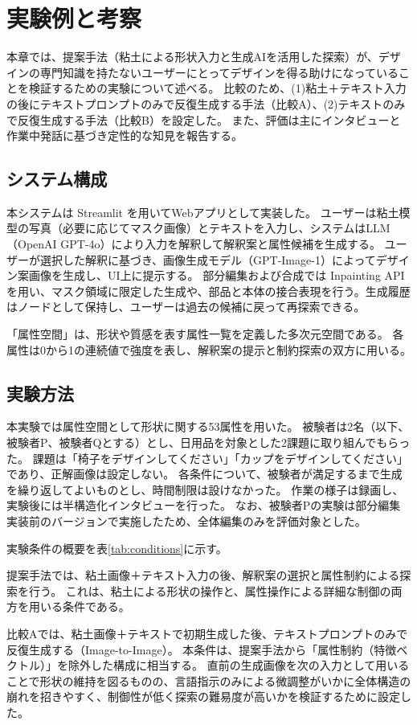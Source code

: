 \documentclass{kuisthesis}
\begin{document}
\section{実験例と考察}
本章では、提案手法（粘土による形状入力と生成AIを活用した探索）が、デザインの専門知識を持たないユーザーにとってデザインを得る助けになっていることを検証するための実験について述べる。
比較のため、(1)粘土＋テキスト入力の後にテキストプロンプトのみで反復生成する手法（比較A）、(2)テキストのみで反復生成する手法（比較B）を設定した。
また、評価は主にインタビューと作業中発話に基づき定性的な知見を報告する。

\subsection{システム構成}
本システムは Streamlit を用いてWebアプリとして実装した。
ユーザーは粘土模型の写真（必要に応じてマスク画像）とテキストを入力し、システムはLLM（OpenAI GPT-4o）により入力を解釈して解釈案と属性候補を生成する。
ユーザーが選択した解釈に基づき、画像生成モデル（GPT-Image-1）によってデザイン案画像を生成し、UI上に提示する。
部分編集および合成では Inpainting API を用い、マスク領域に限定した生成や、部品と本体の接合表現を行う。生成履歴はノードとして保持し、ユーザーは過去の候補に戻って再探索できる。

「属性空間」は、形状や質感を表す属性一覧を定義した多次元空間である。
各属性は0から1の連続値で強度を表し、解釈案の提示と制約探索の双方に用いる。

\subsection{実験方法}
本実験では属性空間として形状に関する53属性を用いた。
被験者は2名（以下、被験者P、被験者Qとする）とし、日用品を対象とした2課題に取り組んでもらった。
課題は「椅子をデザインしてください」「カップをデザインしてください」であり、正解画像は設定しない。
各条件について、被験者が満足するまで生成を繰り返してよいものとし、時間制限は設けなかった。
作業の様子は録画し、実験後には半構造化インタビューを行った。
なお、被験者Pの実験は部分編集実装前のバージョンで実施したため、全体編集のみを評価対象とした。

実験条件の概要を表\ref{tab:conditions}に示す。

提案手法では、粘土画像＋テキスト入力の後、解釈案の選択と属性制約による探索を行う。
これは、粘土による形状の操作と、属性操作による詳細な制御の両方を用いる条件である。

比較Aでは、粘土画像＋テキストで初期生成した後、テキストプロンプトのみで反復生成する（Image-to-Image）。
本条件は、提案手法から「属性制約（特徴ベクトル）」を除外した構成に相当する。
直前の生成画像を次の入力として用いることで形状の維持を図るものの、言語指示のみによる微調整がいかに全体構造の崩れを招きやすく、制御性が低く探索の難易度が高いかを検証するために設定した。
\end{document}
